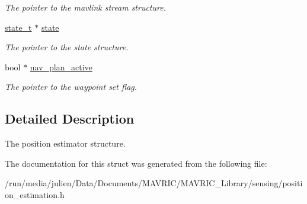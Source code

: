 \begin{DoxyCompactItemize}
\begin{DoxyCompactList}\small\item\em The pointer to the mavlink stream structure. \end{DoxyCompactList}\item 
\hypertarget{structposition__estimator__t_a249de53eaa8f8ffdcf04667fc717aa03}{\hyperlink{structstate__t}{state\+\_\+t} $\ast$ \hyperlink{structposition__estimator__t_a249de53eaa8f8ffdcf04667fc717aa03}{state}}\label{structposition__estimator__t_a249de53eaa8f8ffdcf04667fc717aa03}

\begin{DoxyCompactList}\small\item\em The pointer to the state structure. \end{DoxyCompactList}\item 
\hypertarget{structposition__estimator__t_af26af3a117e3f03866d8cdc9c1688f8b}{bool $\ast$ \hyperlink{structposition__estimator__t_af26af3a117e3f03866d8cdc9c1688f8b}{nav\+\_\+plan\+\_\+active}}\label{structposition__estimator__t_af26af3a117e3f03866d8cdc9c1688f8b}

\begin{DoxyCompactList}\small\item\em The pointer to the waypoint set flag. \end{DoxyCompactList}\end{DoxyCompactItemize}


\subsection{Detailed Description}
The position estimator structure. 

The documentation for this struct was generated from the following file\+:\begin{DoxyCompactItemize}
\item 
/run/media/julien/\+Data/\+Documents/\+M\+A\+V\+R\+I\+C/\+M\+A\+V\+R\+I\+C\+\_\+\+Library/sensing/position\+\_\+estimation.\+h\end{DoxyCompactItemize}
